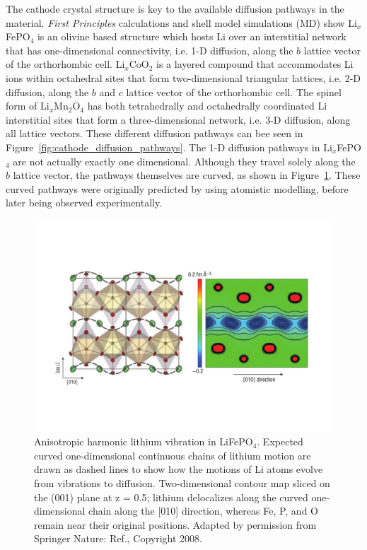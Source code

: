 \documentclass[../main.tex]{subfiles}
\begin{document}
The cathode crystal structure is key to the available diffusion pathways in the material. \textit{First Principles} calculations \cite{Morgan2004,ouyang2004first} and shell model simulations (MD)\cite{islam2005atomic} show Li$_x$FePO$_4$ is an olivine based structure which hosts Li over an interstitial network that has one-dimensional connectivity, i.e. 1-D diffusion, along the $b$ lattice vector of the orthorhombic cell.\cite{amin2006anisotropy} Li$_x$CoO$_2$ is a layered compound that accommodates Li ions within octahedral sites that form two-dimensional triangular lattices, i.e. 2-D diffusion, along the $b$ and $c$ lattice vector of the orthorhombic cell. \cite{van2000lithium} The spinel form of Li$_x$Mn$_2$O$_4$ has both tetrahedrally and octahedrally coordinated Li interstitial sites that form a three-dimensional network, i.e. 3-D diffusion, along all lattice vectors. \cite{thackeray1997manganese,proell20123d} These different diffusion pathways can bee seen in Figure~\ref{fig:cathode_diffusion_pathways}. The 1-D diffusion pathways in Li$_x$FePO$_4$ are not actually exactly one dimensional. Although they travel solely along the $b$ lattice vector, the pathways themselves are curved, as shown in Figure~\ref{fig:curved_pathways}. These curved pathways were originally predicted by \citeauthor{islam2005atomic} using atomistic modelling,\cite{islam2005atomic} before later being observed experimentally. \cite{nishimura2008experimental}

\begin{figure}
    \centering
    \includegraphics[scale=0.5]{figures/curved_1D_paths.pdf}
    \caption{Anisotropic harmonic lithium vibration in LiFePO$_4$. Expected curved one-dimensional continuous chains of lithium motion are drawn as dashed lines to show how the motions of Li atoms evolve from vibrations to diffusion. Two-dimensional contour map sliced on the (001) plane at z = 0.5; lithium delocalizes along the curved one-dimensional chain along the [010] direction, whereas Fe, P, and O remain near their original positions.
    Adapted by permission from Springer Nature: Ref., Copyright 2008.}
    \label{fig:curved_pathways}
\end{figure}
\end{document}
